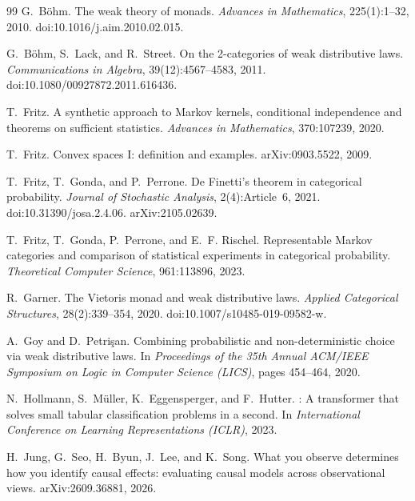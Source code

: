 \documentclass[11pt]{article}
\theoremstyle{definition}
\theoremstyle{remark}
\begin{document}
\begin{thebibliography}{99}
G.~B\"ohm.
\newblock The weak theory of monads.
\newblock \emph{Advances in Mathematics}, 225(1):1--32, 2010.
\newblock doi:10.1016/j.aim.2010.02.015.

G.~B\"ohm, S.~Lack, and R.~Street.
\newblock On the 2-categories of weak distributive laws.
\newblock \emph{Communications in Algebra}, 39(12):4567--4583, 2011.
\newblock doi:10.1080/00927872.2011.616436.

T.~Fritz.
\newblock A synthetic approach to {M}arkov kernels, conditional independence and theorems on
  sufficient statistics.
\newblock \emph{Advances in Mathematics}, 370:107239, 2020.

T.~Fritz.
\newblock Convex spaces {I}: definition and examples.
\newblock arXiv:0903.5522, 2009.

T.~Fritz, T.~Gonda, and P.~Perrone.
\newblock De {F}inetti's theorem in categorical probability.
\newblock \emph{Journal of Stochastic Analysis}, 2(4):Article~6, 2021.
\newblock doi:10.31390/josa.2.4.06. arXiv:2105.02639.

T.~Fritz, T.~Gonda, P.~Perrone, and E.~F. Rischel.
\newblock Representable {M}arkov categories and comparison of statistical experiments in categorical
  probability.
\newblock \emph{Theoretical Computer Science}, 961:113896, 2023.

R.~Garner.
\newblock The {V}ietoris monad and weak distributive laws.
\newblock \emph{Applied Categorical Structures}, 28(2):339--354, 2020.
\newblock doi:10.1007/s10485-019-09582-w.

A.~Goy and D.~Petri\c{s}an.
\newblock Combining probabilistic and non-deterministic choice via weak distributive laws.
\newblock In \emph{Proceedings of the 35th Annual ACM/IEEE Symposium on Logic in Computer Science
  (LICS)}, pages 454--464, 2020.

N.~Hollmann, S.~M\"uller, K.~Eggensperger, and F.~Hutter.
: A transformer that solves small tabular classification problems in a second.
\newblock In \emph{International Conference on Learning Representations (ICLR)}, 2023.

H.~Jung, G.~Seo, H.~Byun, J.~Lee, and K.~Song.
\newblock What you observe determines how you identify causal effects: evaluating causal models
  across observational views.
\newblock arXiv:2609.36881, 2026.


\end{thebibliography}
\end{document}
